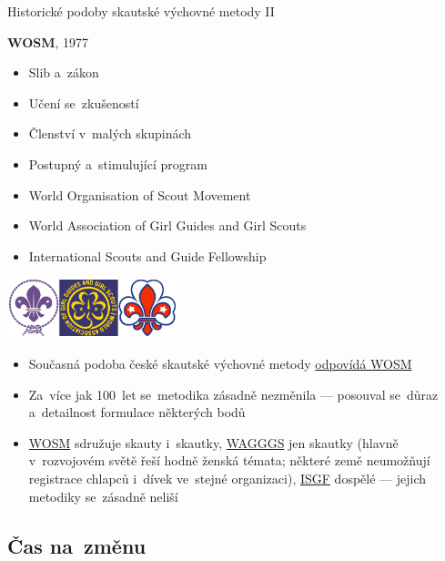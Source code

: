 \documentclass[compress, xelatex, 11pt, xcolor=dvipsnames, print, aspectratio=169,
	hyperref={
		bookmarks=true,
		unicode=true,
		colorlinks=true,
		pdftitle={Skautska vychovna metoda},
		plainpages=false,
		pdfauthor={Vojtech Zeisek},
		pdfsubject={Skautska vychovna metoda a jeji vyvoj za posledni stoleti a desetileti},
		pdfcreator={XeLaTeX},
		pdfkeywords={Junak, Pedagogika, Skaut, Skauting, Vychovna metoda},
		linkcolor=Red, %
		anchorcolor=ForestGreen, %
		citecolor=ForestGreen, %
		filecolor=ForestGreen, %
		menucolor=ForestGreen, %
		urlcolor=Sepia, %
		pdftex},
	url={hyphens, lowtilde} %
	]{beamer}
\begin{document}
\begin{frame}{Historické podoby skautské výchovné metody II}
	\begin{multicols}{2}
		\textbf{WOSM}, 1977
		\begin{itemize}
			\item Slib a~zákon
			\item Učení se~zkušeností
			\item Členství v~malých skupinách
			\item Postupný a~stimulující program
		\end{itemize}
		\columnbreak
		\begin{scriptsize}
			\begin{itemize}
				\item World Organisation of Scout Movement
				\item World Association of Girl Guides and Girl Scouts
				\item International Scouts and Guide Fellowship
			\end{itemize}
		\end{scriptsize}
		\begin{center}
			\includegraphics[height=1.75cm]{loga.png}
		\end{center}
	\end{multicols}
	\begin{itemize}
		\item Současná podoba české skautské výchovné metody \href{https://www.scout.org/who-we-are/scout-movement/scout-method}{odpovídá WOSM}
		\item Za~více jak 100~let se~metodika zásadně nezměnila --- posouval se~důraz a~detailnost formulace některých bodů
		\item \href{https://www.scout.org/}{WOSM} sdružuje skauty i~skautky, \href{https://www.wagggs.org/}{WAGGGS} jen skautky (hlavně v~rozvojovém světě řeší hodně ženská témata; některé země neumožňují registrace chlapců i~dívek ve~stejné organizaci), \href{http://www.isgf.org/}{ISGF} dospělé --- jejich metodiky se~zásadně neliší
	\end{itemize}
\end{frame}

\subsection{Čas na~změnu}
\end{document}
